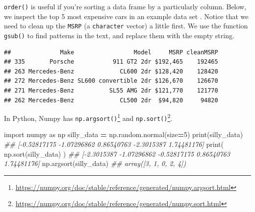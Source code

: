 \documentclass[
  12pt,
  krantz2]{krantz}
\makeatletter
\newenvironment{Shaded}{\begin{snugshade}}{\end{snugshade}}
\newcommand{\AttributeTok}[1]{\textcolor[rgb]{0.61,0.61,0.61}{#1}}
\newcommand{\BuiltInTok}[1]{#1}
\newcommand{\CommentTok}[1]{\textcolor[rgb]{0.37,0.37,0.37}{\textit{#1}}}
\newcommand{\ConstantTok}[1]{\textcolor[rgb]{0,0,0}{#1}}
\newcommand{\DecValTok}[1]{\textcolor[rgb]{0.06,0.06,0.06}{#1}}
\newcommand{\FunctionTok}[1]{\textcolor[rgb]{0,0,0}{#1}}
\newcommand{\ImportTok}[1]{#1}
\newcommand{\NormalTok}[1]{#1}
\newcommand{\OperatorTok}[1]{\textcolor[rgb]{0.43,0.43,0.43}{\textbf{#1}}}
\newcommand{\OtherTok}[1]{\textcolor[rgb]{0.37,0.37,0.37}{#1}}
\newcommand{\SpecialCharTok}[1]{\textcolor[rgb]{0,0,0}{#1}}
\newcommand{\StringTok}[1]{\textcolor[rgb]{0.5,0.5,0.5}{#1}}
\renewcommand{\href}[2]{#2\footnote{\url{#1}}}
\newenvironment{kframe}{%
\medskip{}
\setlength{\fboxsep}{.8em}
 \def\at@end@of@kframe{}%
 \ifinner\ifhmode%
  \def\at@end@of@kframe{\end{minipage}}%
  \begin{minipage}{\columnwidth}%
 \fi\fi%
 \def\FrameCommand##1{\hskip\@totalleftmargin \hskip-\fboxsep
 \colorbox{shadecolor}{##1}\hskip-\fboxsep
     \hskip-\linewidth \hskip-\@totalleftmargin \hskip\columnwidth}%
 \MakeFramed {\advance\hsize-\width
   \@totalleftmargin\z@ \linewidth\hsize
   \@setminipage}}%
 {\par\unskip\endMakeFramed%
 \at@end@of@kframe}
\renewenvironment{Shaded}{\begin{kframe}}{\end{kframe}}
\makeatother
\begin{document}
\texttt{order()} is useful if you're sorting a data frame by a particularly column. Below, we inspect the top 5 most expensive cars in an example data set \citep{sas_cars}. Notice that we need to clean up the \texttt{MSRP} (a \texttt{character} vector) a little first. We use the function \texttt{gsub()} to find patterns in the text, and replace them with the empty string.

\begin{Shaded}
\end{Shaded}

\begin{verbatim}
##              Make                 Model     MSRP cleanMSRP
## 335       Porsche           911 GT2 2dr $192,465    192465
## 263 Mercedes-Benz             CL600 2dr $128,420    128420
## 272 Mercedes-Benz SL600 convertible 2dr $126,670    126670
## 271 Mercedes-Benz          SL55 AMG 2dr $121,770    121770
## 262 Mercedes-Benz             CL500 2dr  $94,820     94820
\end{verbatim}

In Python, Numpy has \href{https://numpy.org/doc/stable/reference/generated/numpy.argsort.html}{\texttt{np.argsort()}} and \href{https://numpy.org/doc/stable/reference/generated/numpy.sort.html}{\texttt{np.sort()}}.

\begin{Shaded}
\begin{Highlighting}[]
\ImportTok{import}\NormalTok{ numpy }\ImportTok{as}\NormalTok{ np}
\NormalTok{silly\_data }\OperatorTok{=}\NormalTok{ np.random.normal(size}\OperatorTok{=}\DecValTok{5}\NormalTok{)}
\BuiltInTok{print}\NormalTok{(silly\_data)}
\CommentTok{\#\# [{-}0.52817175 {-}1.07296862  0.86540763 {-}2.3015387   1.74481176]}
\BuiltInTok{print}\NormalTok{( np.sort(silly\_data) )}
\CommentTok{\#\# [{-}2.3015387  {-}1.07296862 {-}0.52817175  0.86540763  1.74481176]}
\NormalTok{np.argsort(silly\_data)}
\CommentTok{\#\# array([3, 1, 0, 2, 4])}
\end{Highlighting}
\end{Shaded}
\end{document}
